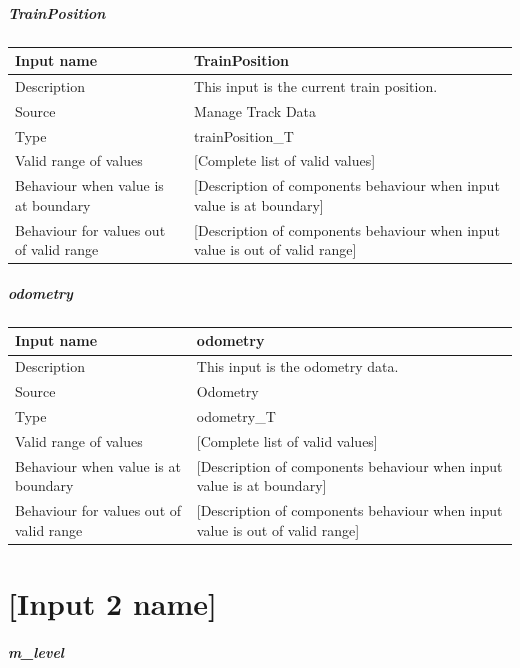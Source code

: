 \paragraph{TrainPosition}

\begin{longtable}{p{}p{}}
\toprule
Input name				& TrainPosition \\
\midrule
Description				& This input is the current train position. \\
\midrule
Source					& Manage Track Data \\ 
\midrule
Type					& trainPosition\_T \\
\midrule
Valid range of values	& [Complete list of valid values] \\
\midrule
Behaviour when value is at boundary	& [Description of components behaviour when input value is at boundary] \\
\midrule
Behaviour for values out of valid range	& [Description of components behaviour when input value is out of valid range] \\
\bottomrule
\end{longtable}


\paragraph{odometry}

\begin{longtable}{p{}p{}}
\toprule
Input name				& odometry \\
\midrule
Description				& This input is the odometry data. \\
\midrule
Source					& Odometry \\ 
\midrule
Type					& odometry\_T \\
\midrule
Valid range of values	& [Complete list of valid values] \\
\midrule
Behaviour when value is at boundary	& [Description of components behaviour when input value is at boundary] \\
\midrule
Behaviour for values out of valid range	& [Description of components behaviour when input value is out of valid range] \\
\bottomrule
\end{longtable}\chapter{[Input 2 name]}


\paragraph{m\_level}

